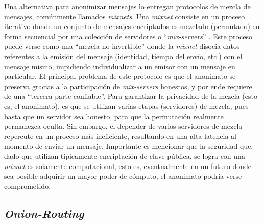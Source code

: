 Una alternativa para anonimizar mensajes lo entregan protocolos de mezcla de 
mensajes, comúnmente llamados \emph{mixnets}. Una \emph{mixnet} consiste en un 
proceso iterativo donde un conjunto de mensajes encriptados es mezclado 
(permutado) en forma secuencial por una colección de servidores o 
``\emph{mix-servers}'' \cite{chaum1981untraceable}. Este proceso puede verse 
como una ``mezcla no invertible'' donde la \emph{mixnet} disocia datos 
referentes a la emisión del mensaje (identidad, tiempo del envío, etc.) con el 
mensaje mismo, impidiendo individualizar a un emisor con un mensaje en 
particular. El principal problema de este protocolo es que el anonimato se 
preserva gracias a la participación de \emph{mix-servers} honestos, y por ende 
requiere de una ``tercera parte confiable''. Para garantizar la privacidad de 
la mezcla (esto es, el anonimato), es que se utilizan varias etapas 
(servidores) de mezcla, pues basta que un servidor sea honesto, para que la 
permutación realmente permanezca oculta. Sin embargo, el depender de varios 
servidores de mezcla repercute en un proceso más ineficiente, resultando en 
una alta latencia al momento de enviar un mensaje. Importante es mencionar que 
la seguridad que, dado que utilizan típicamente encriptación de clave pública, 
se logra con una \emph{mixnet} es solamente computacional, esto es, 
eventualmente en un futuro donde sea posible adquirir un mayor poder de 
cómputo, el anonimato podría verse comprometido.

\subsection{\emph{Onion-Routing}}

